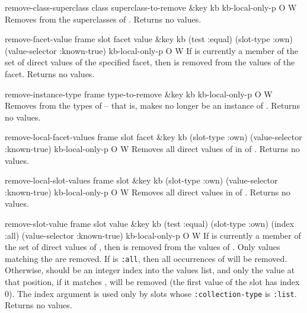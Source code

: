 \begin{okbcop}{remove-class-superclass}{ class superclass-to-remove \&key kb kb-local-only-p} { \void } { O } { W } {  }
Removes  from the superclasses of .
   Returns no values.
\end{okbcop}

\begin{okbcop}{remove-facet-value}{ frame slot facet value \&key kb (test :equal) (slot-type :own) (value-selector :known-true) kb-local-only-p} { \void } { O } { W } {  }
If  is currently a member of the set of direct values of
   the specified facet, then  is removed from the values of
   the facet.  Returns no values.
\end{okbcop}

\begin{okbcop}{remove-instance-type}{ frame type-to-remove \&key kb kb-local-only-p} { \void } { O } { W } {  }
Removes  from the types of  -- that is,
   makes  no longer be an instance of .
   Returns no values.
\end{okbcop}

\begin{okbcop}{remove-local-facet-values}{ frame slot facet \&key kb (slot-type :own) (value-selector :known-true) kb-local-only-p} { \void } { O } { W } {  }
Removes all direct values of  in  of .
   Returns no values.
\end{okbcop}

\begin{okbcop}{remove-local-slot-values}{ frame slot \&key kb (slot-type :own) (value-selector :known-true) kb-local-only-p} { \void } { O } { W } {  }
Removes all direct values in  of .
   Returns no values.
\end{okbcop}

\begin{okbcop}{remove-slot-value}{ frame slot value \&key kb (test :equal) (slot-type :own) (index :all) (value-selector :known-true) kb-local-only-p} { \void } { O } { W } {  }
If  is currently a member of the set of direct values of
   , then  is removed from the values of
   .  Only values matching the  are removed.
   If  is {\tt :all}, then all occurrences of
    will be removed.  Otherwise,  should be
   an integer index into the values list, and only the value at that
   position, if it matches , will be removed (the first
   value of the slot has index 0).  The index argument is used only by slots
   whose {\tt :collection-type} is {\tt :list}.  Returns no values.
\end{okbcop}

